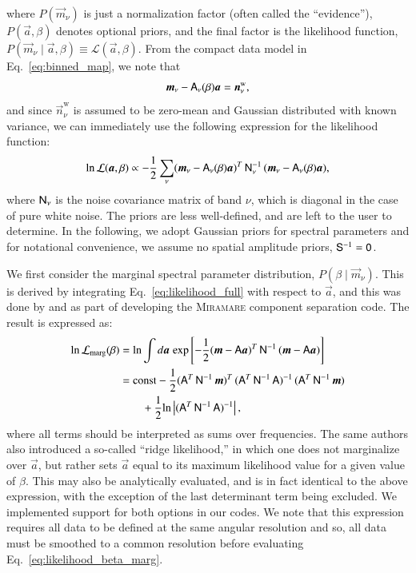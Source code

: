 \documentclass{aa}
\def\,{\thinspace}
\newcommand{\A}[0]{\tens{A}}
\newcommand{\n}[0]{\vec{n}}
\renewcommand{\a}[0]{\vec{a}}
\newcommand{\m}[0]{\vec{m}}
\newcommand{\N}[0]{\tens{N}}
\newcommand{\iN}[0]{\tens{N}^{-1}}
\renewcommand{\S}[0]{\tens{S}}
\begin{document}
where $P(\m_{\nu})$ is just a normalization factor (often called the
``evidence''), $P(\a,\beta)$ denotes optional priors, and the final
factor is the likelihood function, $P(\m_{\nu}\mid\a,\beta) \equiv
\mathcal{L}(\a,\beta)$. From the compact data model in
Eq.~\eqref{eq:binned_map}, we note that
\begin{equation}
  \m_{\nu} - \A_{\nu}(\beta)\a = \n^{\mathrm{w}}_{\nu},
  \label{eq:map_residual}
\end{equation}
and since $\n^{\mathrm{w}}_{\nu}$ is assumed to be zero-mean and
Gaussian distributed with known variance, we can immediately use the following expression for the likelihood function:
\begin{equation}
  \ln\mathcal{L}(\a,\beta) \propto -\frac{1}{2}\sum_{\nu}(\m_\nu-\A_\nu(\beta) \a)^T\, \iN_\nu\, (\m_\nu-\A_\nu(\beta) \a),
  \label{eq:likelihood_full}  
\end{equation}
where $\N_\nu$ is the noise covariance matrix of band $\nu$, 
which is diagonal in the case of pure white noise.
The priors are less well-defined, and are left to the user to determine. In
the following, we adopt Gaussian priors for spectral parameters
and for notational convenience, we assume no spatial amplitude priors, $\S^{-1}=\tens 0$.

We first consider the marginal spectral parameter distribution,
$P(\beta\mid\m_{\nu})$. This is derived by integrating
Eq.~\eqref{eq:likelihood_full} with respect to $\a$, and this was done
by \citet{2009MNRAS.392..216S} and \citet{stivoli:2010} as part of developing the
\textsc{Miramare} component separation code. The result is expressed as:
 \begin{align}
   \mathrm{ln}\,\mathcal{L}_{\mathrm{marg}}(\beta) &= \mathrm{ln} \int d\a \; \mathrm{exp} \left[-\frac{1}{2}(\m-\A\a)^T\, \iN\, (\m-\A\a)\right] \nonumber \\
   &= \mathrm{const} -\frac{1}{2} (\A^T\,\iN\, \m)^T\, (\A^T\,\iN\, \A)^{-1}\,(\A^T\,\iN\, \m) \nonumber \\
   &\quad\quad+ \frac{1}{2}\mathrm{ln} \left| (\A^T\,\iN\, \A)^{-1}\right|,  \label{eq:likelihood_beta_marg}
\end{align}
where all terms should be interpreted as sums over frequencies. The
same authors also introduced a so-called ``ridge likelihood,'' in which
one does not marginalize over $\a$, but rather sets $\a$ equal to its
maximum likelihood value for a given value of $\beta$. This may also
be analytically evaluated, and is in fact identical to the above
expression, with the exception of  the last determinant term being excluded. We implemented
support for both options in our codes. We note that this expression
requires all data to be defined at the same angular resolution and so,
all data must be smoothed to a common resolution before evaluating
Eq.~\eqref{eq:likelihood_beta_marg}.
\end{document}
